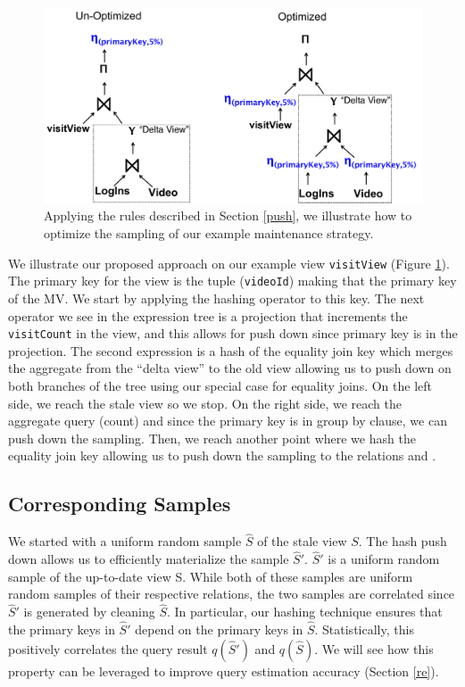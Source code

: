 \begin{figure}[t] \vspace{-2em}
\centering
 \includegraphics[scale=0.22]{figs/example_expression_tree_2.pdf} \vspace{-.5em}
 \caption{Applying the rules described in Section \ref{push}, we illustrate how to optimize the sampling of our example maintenance strategy. \label{exexpr2}}\vspace{-1em}
\end{figure}

\begin{example}
We illustrate our proposed approach on our example view \texttt{visitView} (Figure \ref{exexpr2}). 
The primary key for the view is the tuple (\texttt{videoId}) making that the primary key of the MV.
We start by applying the hashing operator to this key.
The next operator we see in the expression tree is a projection that increments the \texttt{visitCount} in the view, and this allows
for push down since primary key is in the projection.
The second expression is a hash of the equality join key which merges the aggregate from the ``delta view'' to the old view allowing us to push down on both branches of the tree using our special case for equality joins.
On the left side, we reach the stale view so we stop.
On the right side, we reach the aggregate query (count) and since the primary key is in group by clause, we can push down the sampling.
Then, we reach another point where we hash the equality join key allowing us to push down the sampling to the relations  and .
\end{example}

\subsection{Corresponding Samples}
We started with a uniform random sample $\widehat{S}$ of the stale view $S$.
The hash push down allows us to efficiently materialize the sample $\widehat{S}'$.
$\widehat{S}'$ is a uniform random sample of the up-to-date view S.
While both of these samples are uniform random samples of their respective relations, 
the two samples are correlated since $\widehat{S}'$ is generated by cleaning $\widehat{S}$.
In particular, our hashing technique ensures that the primary keys in $\widehat{S}'$ depend on the primary keys in $\widehat{S}$.
Statistically, this positively correlates the query result $q(\widehat{S}')$ and $q(\widehat{S})$. 
We will see how this property can be leveraged to improve query estimation accuracy (Section \ref{re}). 

